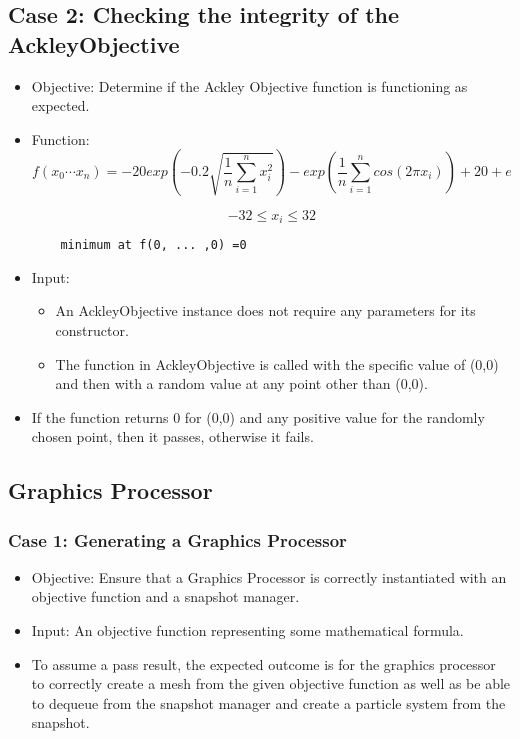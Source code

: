 \documentclass[11pt]{article}
\begin{document}
\subsection{Case 2: Checking the integrity of the AckleyObjective}
\begin{itemize}
	\item Objective: Determine if the Ackley Objective function is functioning as expected.
	\item Function:
	$$f(x_0 \cdots x_n) = -20 exp(-0.2 \sqrt{\frac{1}{n} \sum_{i=1}^n x_i^2}) - exp(\frac{1}{n} \sum_{i=1}^n cos(2\pi x_i)) + 20 + e$$ 
	
	$$-32 \leq x_i \leq 32$$ 
	\begin{center}
	\begin{verbatim}
	minimum at f(0, ... ,0) =0
	\end{verbatim}
	
	\end{center}
	
	
	\item Input: \begin{itemize}
		\item An AckleyObjective instance does not require any parameters for its constructor.
		\item The function in AckleyObjective is called with the specific value of (0,0) and then with a random value at any point other than (0,0).
	\end{itemize}
	\item If the function returns 0 for (0,0) and any positive value for the randomly chosen point, then it passes, otherwise it fails.
\end{itemize}


\subsection{Graphics Processor}
\subsubsection{Case 1: Generating a Graphics Processor}
\begin{itemize}
	\item Objective: Ensure that a Graphics Processor is correctly instantiated with an objective function and a snapshot manager.
	\item Input: An objective function representing some mathematical formula.
	\item To assume a pass result, the expected outcome is for the graphics processor to correctly create a mesh from the given objective function as well as be able to dequeue from the snapshot manager and create a particle system from the snapshot.
\end{itemize}
\end{document}
